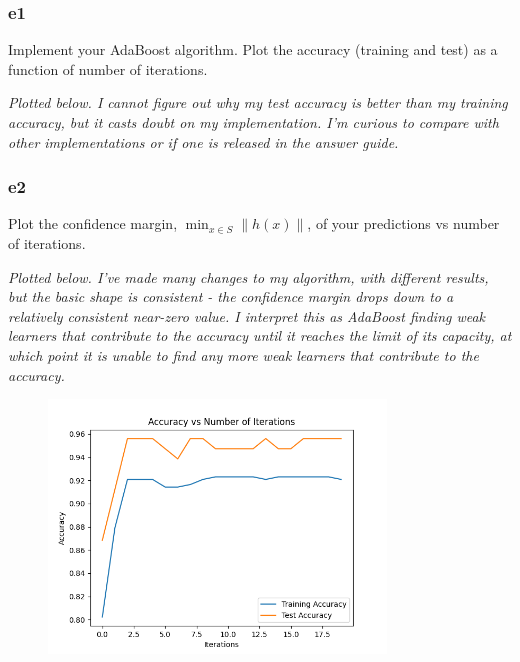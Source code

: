 \documentclass{article}
\begin{document}
\subsubsection*{e1}
Implement your AdaBoost algorithm. Plot the accuracy (training and test) as a function of number of iterations.

\textit{Plotted below. I cannot figure out why my test accuracy is better than my training accuracy, but it casts doubt on my implementation.
I'm curious to compare with other implementations or if one is released in the answer guide.}

\subsubsection*{e2}
Plot the confidence margin, $\min_{x \in S}\|h(x)\|$, of your predictions vs number of iterations.

\textit{Plotted below. I've made many changes to my algorithm, with different results, but the basic shape is consistent - the confidence margin drops down to a relatively consistent near-zero value.
I interpret this as AdaBoost finding weak learners that contribute to the accuracy until it reaches the limit of its capacity, at which point it is unable to find any more weak learners that contribute to the accuracy.}

\begin{figure}
    \centering
    \includegraphics[width=0.8\textwidth]{images/adaboost_train_test_accuracy.png}
    \label{fig:boosting_accuracy}
\end{figure}
\end{document}

